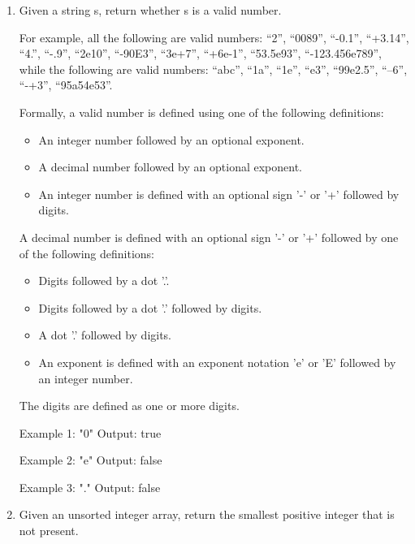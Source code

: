 \underline{}
\newpage
\begin{enumerate}
\item {}

Given a string s, return whether s is a valid number.

For example, all the following are valid numbers: ``2'', ``0089'', ``-0.1'', ``+3.14'', ``4.'', ``-.9'', ``2e10'', ``-90E3'', ``3e+7'', ``+6e-1'', ``53.5e93'', ``-123.456e789'', while the following are \textbf{} valid numbers: ``abc'', ``1a'', ``1e'', ``e3'', ``99e2.5'', ``--6'', ``-+3'', ``95a54e53''.

Formally, a valid number is defined using one of the following definitions:
\begin{itemize}
\item An integer number followed by an optional exponent.
\item A decimal number followed by an optional exponent.
\item An integer number is defined with an optional sign '-' or '+' followed by digits.
\end{itemize}

A decimal number is defined with an optional sign '-' or '+' followed by one of the following definitions:
\begin{itemize}
\item Digits followed by a dot '.'.
\item Digits followed by a dot '.' followed by digits.
\item A dot '.' followed by digits.
\item An exponent is defined with an exponent notation 'e' or 'E' followed by an integer number.
\end{itemize}
The digits are defined as one or more digits.
\begin{console}
Example 1: "0"
Output:    true

Example 2: "e"
Output:    false

Example 3: "."
Output:    false
\end{console}\newpage

\item {}

Given an unsorted integer array, return the smallest positive integer that is not present.


\end{enumerate}

